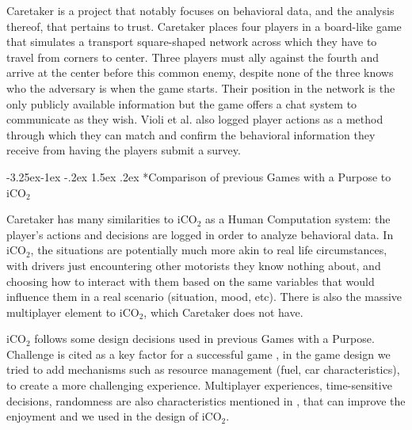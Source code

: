 \documentclass[preprint,authoryear,12pt]{elsarticle}
\makeatletter
\renewcommand{\paragraph}{\@startsection{paragraph}{4}{\z@}%
  {-3.25ex\@plus -1ex \@minus -.2ex}%
  {1.5ex \@plus .2ex}%
  {\normalfont\normalsize\mdseries}}
\makeatother
\begin{document}
Caretaker \citep{Violi:2011} is a project that notably focuses on behavioral data, and the analysis thereof, that pertains to trust. Caretaker places four players in a board-like game that simulates a transport square-shaped network across which they have to travel from corners to center. Three players must ally against the fourth and arrive at the center before this common enemy, despite none of the three knows who the adversary is when the game starts. Their position in the network is the only publicly available information but the game offers a chat system to communicate as they wish. Violi et al. also logged player actions as a method through which they can match and confirm the behavioral information they receive from having the players submit a survey.

\paragraph*{Comparison of previous Games with a Purpose to iCO$_2$}

Caretaker has many similarities to iCO$_2$ as a Human Computation system: the player's actions and decisions are logged in order to analyze behavioral data.
In iCO$_2$, the situations are potentially much more akin to real life circumstances, with drivers just encountering other motorists they know nothing about, and choosing how to interact with them based on the same variables that would influence them in a real scenario (situation, mood, etc). There is also the massive multiplayer element to iCO$_2$, which Caretaker does not have.



iCO$_2$ follows some design decisions used in previous Games with a Purpose. Challenge is cited as a key factor for a successful game \cite{vonAhn.2008}, in the game design we tried to add mechanisms such as resource management (fuel, car characteristics), to create a more challenging experience. Multiplayer experiences, time-sensitive decisions, randomness are also characteristics mentioned in \cite{vonAhn.2008}, that can improve the enjoyment and we used in the design of iCO$_2$.
\end{document}
